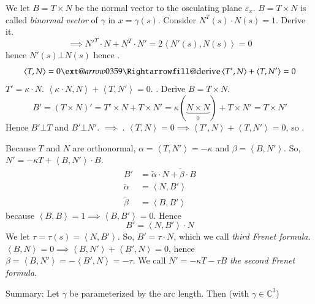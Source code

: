 \documentclass{article}
\makeatletter
\newcommand{\angel}[1]{\left\langle#1\right\rangle}
\newcommand{\xRightarrow}[2][]{\ext@arrow 0359\Rightarrowfill@{#1}{#2}}
\makeatother
\begin{document}
We let $B = T \times N$ be the normal vector to the osculating plane $\varepsilon_x$.
$B = T \times N$ is called \emph{binormal vector} of $\gamma$ in $x = \gamma(s)$.
Consider $N^T(s) \cdot N(s) = 1$. Derive it.
\[ \implies N'^T \cdot N + N^T \cdot N' = 2 \angel{N'(s), N(s)} = 0 \]
hence $N'(s) \bot N(s)$ hence .
\[ \angel{T, N} = 0 \xRightarrow{\text{derive}} \angel{T', N} + \angel{T, N'} = 0 \]
$T' = \kappa \cdot N$. $\angel{\kappa \cdot N, N} + \angel{T, N'} = 0$.
\fbox{$\angel{T, N'} = -\kappa$}.
Derive $B = T \times N$.
\[ B' = (T \times N)' = T' \times N + T \times N' = \kappa(\underbrace{N \times N}_{0}) + T \times N' = T \times N' \]
Hence $B' \bot T$ and $B' \bot N'$. $\implies$ .
$\angel{T, N} = 0 \implies \angel{T', N} + \angel{T, N'} = 0$, so \fbox{$\angel{N', T} = -\angel{T', N}$}.

Because $T$ and $N$ are orthonormal, $\alpha = \angel{T, N'} = -\kappa$ and $\beta = \angel{B, N'}$.
So, $N' = -\kappa T + \angel{B, N'} \cdot B$.
\begin{align*}
  B' &= \tilde\alpha \cdot N + \tilde\beta \cdot B \\
  \tilde\alpha &= \angel{N, B'} \\
  \tilde\beta &= \angel{B, B'}
\end{align*}
because $\angel{B, B} = 1 \implies \angel{B, B'} = 0$.
Hence
\[ B' = \angel{N, B'} \cdot N \]
We let $\tau = \tau(s) = \angel{N, B'}$.
So, $B' = \tau \cdot N$, which we call \emph{third Frenet formula}.
$\angel{B, N} = 0 \implies \angel{B, N'} + \angel{B', N} = 0$,
hence $\beta = \angel{B, N'} = -\angel{B', N} = -\tau$.
We call $N' = -\kappa T - \tau B$ \emph{the second Frenet formula}.

Summary: Let $\gamma$ be parameterized by the arc length.
Then (with $\gamma \in \mathbb C^3$)
\end{document}
